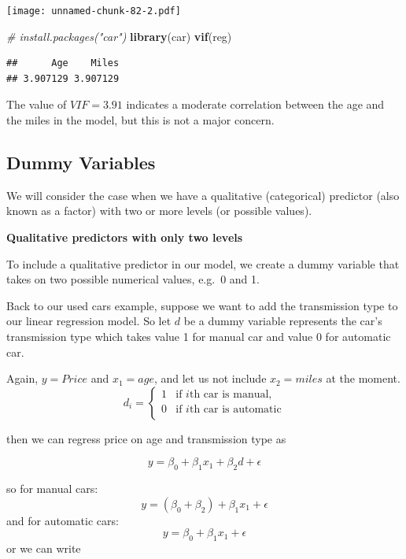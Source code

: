 \documentclass[
]{article}
\newenvironment{Shaded}{\begin{snugshade}}{\end{snugshade}}
\newcommand{\CommentTok}[1]{\textcolor[rgb]{0.56,0.35,0.01}{\textit{#1}}}
\newcommand{\FunctionTok}[1]{\textcolor[rgb]{0.13,0.29,0.53}{\textbf{#1}}}
\newcommand{\NormalTok}[1]{#1}
\begin{document}
\texttt{[image: unnamed-chunk-82-2.pdf]}

\begin{Shaded}
\begin{Highlighting}[]
\CommentTok{\# install.packages("car")}
\FunctionTok{library}\NormalTok{(car)}
\FunctionTok{vif}\NormalTok{(reg)}
\end{Highlighting}
\end{Shaded}

\begin{verbatim}
##      Age    Miles 
## 3.907129 3.907129
\end{verbatim}

The value of \(VIF=3.91\) indicates a moderate correlation between the
age and the miles in the model, but this is not a major concern.

\hypertarget{dummy-variables}{%
\subsection{Dummy Variables}\label{dummy-variables}}

We will consider the case when we have a qualitative (categorical)
predictor (also known as a factor) with two or more levels (or possible
values).

\textbf{Qualitative predictors with only two levels}

To include a qualitative predictor in our model, we create a dummy
variable that takes on two possible numerical values, e.g.~0 and 1.

Back to our used cars example, suppose we want to add the transmission
type to our linear regression model. So let \(d\) be a dummy variable
represents the car's transmission type which takes value 1 for manual
car and value 0 for automatic car.

Again, \(y=Price\) and \(x_1=age\), and let us not include \(x_2=miles\)
at the moment. \[d_i=\left\{\begin{array}{ll}
1& \text{if $i$th car is manual,}\\
0& \text{if $i$th car is automatic}\\
\end{array}\right.\]

then we can regress price on age and transmission type as

\[y=\beta_0+\beta_1 x_1+\beta_2 d+\epsilon\]

so for manual cars: \[y=(\beta_0+\beta_2)+\beta_1 x_1+\epsilon\] and for
automatic cars: \[y=\beta_0+\beta_1 x_1+\epsilon\] or we can write
\end{document}
